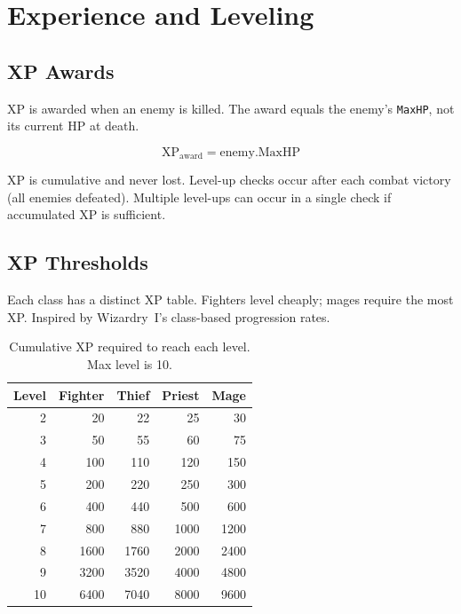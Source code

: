 \documentclass[a4paper,10pt]{article}
\newcommand{\field}[1]{\texttt{#1}}
\begin{document}
\section{Experience and Leveling}

\subsection{XP Awards}

XP is awarded when an enemy is killed. The award equals the enemy's
\field{MaxHP}, not its current HP at death.

\[
  \text{XP}_\text{award} = \text{enemy.MaxHP}
\]

XP is cumulative and never lost. Level-up checks occur after each combat
victory (all enemies defeated). Multiple level-ups can occur in a single
check if accumulated XP is sufficient.

\subsection{XP Thresholds}

Each class has a distinct XP table. Fighters level cheaply; mages require
the most XP. Inspired by Wizardry~I's class-based progression rates.

\begin{table}[h]
\centering
\begin{tabular}{@{}rrrrr@{}}
\toprule
\textbf{Level} & \textbf{Fighter} & \textbf{Thief} & \textbf{Priest} & \textbf{Mage} \\
\midrule
2  & 20    & 22    & 25    & 30    \\
3  & 50    & 55    & 60    & 75    \\
4  & 100   & 110   & 120   & 150   \\
5  & 200   & 220   & 250   & 300   \\
6  & 400   & 440   & 500   & 600   \\
7  & 800   & 880   & 1000  & 1200  \\
8  & 1600  & 1760  & 2000  & 2400  \\
9  & 3200  & 3520  & 4000  & 4800  \\
10 & 6400  & 7040  & 8000  & 9600  \\
\bottomrule
\end{tabular}
\caption{Cumulative XP required to reach each level. Max level is 10.}
\label{tab:xp}
\end{table}
\end{document}
